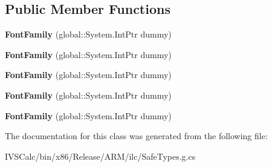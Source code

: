\subsection*{Public Member Functions}
\begin{DoxyCompactItemize}
\item 
\mbox{\label{class_windows_1_1_u_i_1_1_xaml_1_1_media_1_1_font_family_a7714ad31cb58c30a0574a8dd82e151f5}} 
{\bfseries Font\+Family} (global\+::\+System.\+Int\+Ptr dummy)
\item 
\mbox{\label{class_windows_1_1_u_i_1_1_xaml_1_1_media_1_1_font_family_a7714ad31cb58c30a0574a8dd82e151f5}} 
{\bfseries Font\+Family} (global\+::\+System.\+Int\+Ptr dummy)
\item 
\mbox{\label{class_windows_1_1_u_i_1_1_xaml_1_1_media_1_1_font_family_a7714ad31cb58c30a0574a8dd82e151f5}} 
{\bfseries Font\+Family} (global\+::\+System.\+Int\+Ptr dummy)
\item 
\mbox{\label{class_windows_1_1_u_i_1_1_xaml_1_1_media_1_1_font_family_a7714ad31cb58c30a0574a8dd82e151f5}} 
{\bfseries Font\+Family} (global\+::\+System.\+Int\+Ptr dummy)
\item 
\mbox{\label{class_windows_1_1_u_i_1_1_xaml_1_1_media_1_1_font_family_a7714ad31cb58c30a0574a8dd82e151f5}} 
{\bfseries Font\+Family} (global\+::\+System.\+Int\+Ptr dummy)
\end{DoxyCompactItemize}


The documentation for this class was generated from the following file\+:\begin{DoxyCompactItemize}
\item 
I\+V\+S\+Calc/bin/x86/\+Release/\+A\+R\+M/ilc/Safe\+Types.\+g.\+cs\end{DoxyCompactItemize}
